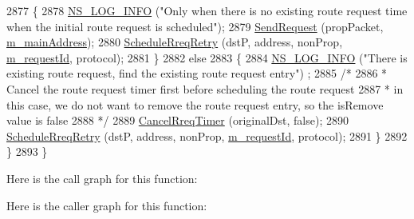 \begin{DoxyCode}
2877         \{
2878           \hyperlink{group__logging_gafbd73ee2cf9f26b319f49086d8e860fb}{NS\_LOG\_INFO} (\textcolor{stringliteral}{"Only when there is no existing route request time when the initial route
       request is scheduled"});
2879           \hyperlink{classns3_1_1dsr_1_1DsrRouting_a21496638c09e75ea310e876135d0bf64}{SendRequest} (propPacket, \hyperlink{classns3_1_1dsr_1_1DsrRouting_a73182b5edee2d8460f28855e058fc9a0}{m\_mainAddress});
2880           \hyperlink{classns3_1_1dsr_1_1DsrRouting_a056b38f3af6c2992be89b8fc5cb15448}{ScheduleRreqRetry} (dstP, address, nonProp, 
      \hyperlink{classns3_1_1dsr_1_1DsrRouting_a4d9ddfed8e907a5885bb5e0f4b41f388}{m\_requestId}, protocol);
2881         \}
2882       \textcolor{keywordflow}{else}
2883         \{
2884           \hyperlink{group__logging_gafbd73ee2cf9f26b319f49086d8e860fb}{NS\_LOG\_INFO} (\textcolor{stringliteral}{"There is existing route request, find the existing route request entry"})
      ;
2885           \textcolor{comment}{/*}
2886 \textcolor{comment}{           * Cancel the route request timer first before scheduling the route request}
2887 \textcolor{comment}{           * in this case, we do not want to remove the route request entry, so the isRemove value is false}
2888 \textcolor{comment}{           */}
2889           \hyperlink{classns3_1_1dsr_1_1DsrRouting_ad489fa602b093c8336cf4143ed60e429}{CancelRreqTimer} (originalDst, \textcolor{keyword}{false});
2890           \hyperlink{classns3_1_1dsr_1_1DsrRouting_a056b38f3af6c2992be89b8fc5cb15448}{ScheduleRreqRetry} (dstP, address, nonProp, 
      \hyperlink{classns3_1_1dsr_1_1DsrRouting_a4d9ddfed8e907a5885bb5e0f4b41f388}{m\_requestId}, protocol);
2891         \}
2892     \}
2893 \}
\end{DoxyCode}


Here is the call graph for this function\+:




Here is the caller graph for this function\+:


